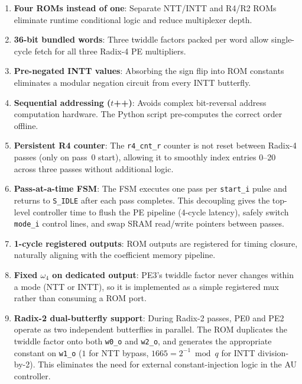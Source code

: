 \documentclass[11pt,a4paper]{article}
\newcommand{\sv}[1]{\texttt{#1}}
\newcommand{\port}[1]{\texttt{#1}}
\begin{document}
\begin{enumerate}[label=\textbf{D\arabic*.}]
  \item \textbf{Four ROMs instead of one}: Separate NTT/INTT and R4/R2 ROMs eliminate runtime conditional logic and reduce multiplexer depth.

  \item \textbf{36-bit bundled words}: Three twiddle factors packed per word allow single-cycle fetch for all three Radix-4 PE multipliers.

  \item \textbf{Pre-negated INTT values}: Absorbing the sign flip into ROM constants eliminates a modular negation circuit from every INTT butterfly.

  \item \textbf{Sequential addressing ($t$++)}: Avoids complex bit-reversal address computation hardware. The Python script pre-computes the correct order offline.

  \item \textbf{Persistent R4 counter}: The \sv{r4\_cnt\_r} counter is not reset between Radix-4 passes (only on pass~0 start), allowing it to smoothly index entries 0--20 across three passes without additional logic.

  \item \textbf{Pass-at-a-time FSM}: The FSM executes one pass per \port{start\_i} pulse and returns to \sv{S\_IDLE} after each pass completes. This decoupling gives the top-level controller time to flush the PE pipeline (4-cycle latency), safely switch \port{mode\_i} control lines, and swap SRAM read/write pointers between passes.

  \item \textbf{1-cycle registered outputs}: ROM outputs are registered for timing closure, naturally aligning with the coefficient memory pipeline.

  \item \textbf{Fixed $\omega_4$ on dedicated output}: PE3's twiddle factor never changes within a mode (NTT or INTT), so it is implemented as a simple registered mux rather than consuming a ROM port.

  \item \textbf{Radix-2 dual-butterfly support}: During Radix-2 passes, PE0 and PE2 operate as two independent butterflies in parallel. The ROM duplicates the twiddle factor onto both \port{w0\_o} and \port{w2\_o}, and generates the appropriate constant on \port{w1\_o} ($1$ for NTT bypass, $1665 = 2^{-1} \bmod q$ for INTT division-by-2). This eliminates the need for external constant-injection logic in the AU controller.
\end{enumerate}
\end{document}
